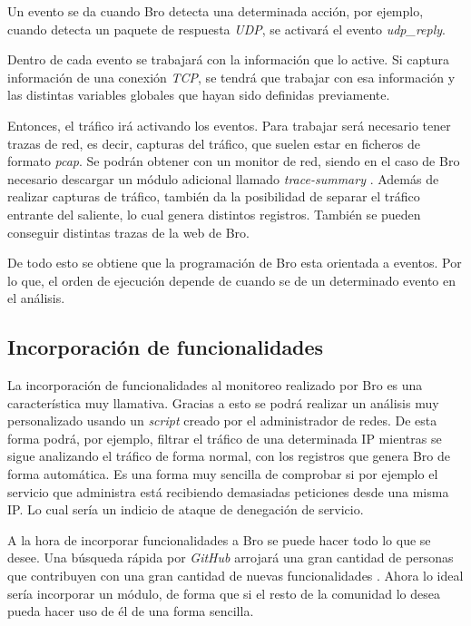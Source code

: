 Un evento se da cuando Bro detecta una determinada acción, por ejemplo, cuando detecta un paquete de respuesta \textit{UDP}, se 
activará el evento \textit{udp\_reply}.

\intro Dentro de cada evento se trabajará con la información que lo active. Si captura información de una conexión 
\textit{TCP}, se tendrá que trabajar con esa información y las distintas variables globales que hayan sido definidas previamente.

\intro Entonces, el tráfico irá activando los eventos. Para trabajar será necesario tener trazas de red, es decir, capturas del 
tráfico, que suelen estar en ficheros de formato \textit{pcap}. Se podrán obtener con un monitor de red, siendo en el caso de Bro 
necesario descargar un módulo adicional llamado \textit{trace-summary} \cite{brotrace}. Además de realizar capturas de tráfico, 
también da la posibilidad de separar el tráfico entrante del saliente, lo cual genera distintos registros. También se pueden 
conseguir distintas trazas de la web de Bro.

\intro De todo esto se obtiene que la programación de Bro esta orientada a eventos. Por lo que, el orden de ejecución depende de 
cuando se de un determinado evento en el análisis.

\subsection{Incorporación de funcionalidades}

La incorporación de funcionalidades al monitoreo realizado por Bro es una característica muy llamativa. Gracias 
a esto se podrá realizar un análisis muy personalizado usando un \textit{script} creado por el administrador de redes. De 
esta forma podrá, por ejemplo, filtrar el tráfico de una determinada IP mientras se sigue analizando el tráfico 
de forma normal, con los registros que genera Bro de forma automática. Es una forma muy sencilla de comprobar 
si por ejemplo el servicio que administra está recibiendo demasiadas peticiones desde una misma IP. Lo cual 
sería un indicio de ataque de denegación de servicio.

\intro A la hora de incorporar funcionalidades a Bro se puede hacer todo lo que se desee. Una búsqueda rápida 
por \textit{GitHub} arrojará una gran cantidad de personas que contribuyen con una gran cantidad de nuevas 
funcionalidades \citep{gitbeacon}. Ahora lo ideal sería incorporar un módulo, de forma que si el resto 
de la comunidad lo desea pueda hacer uso de él de una forma sencilla.

